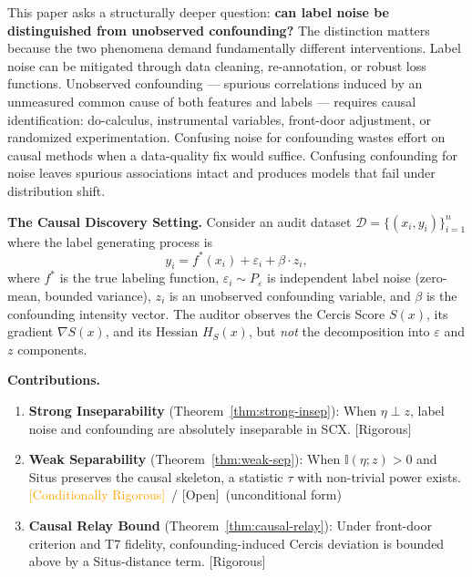 \documentclass[12pt,a4paper]{article}
\newcommand{\rigorous}{\textcolor{green!50!black}{\small\textsf{[Rigorous]}}}
\newcommand{\conditionallyrigorous}{\textcolor{orange}{\small\textsf{[Conditionally Rigorous]}}}
\newcommand{\openquest}{\textcolor{red!70!black}{\small\textsf{[Open]}}}
\newcommand{\I}{\mathbb{I}}
\newcommand{\cD}{\mathcal{D}}
\begin{document}
This paper asks a structurally deeper question: \textbf{can label noise be
distinguished from unobserved confounding?}  The distinction matters because
the two phenomena demand fundamentally different interventions.  Label noise
can be mitigated through data cleaning, re-annotation, or robust loss
functions.  Unobserved confounding — spurious correlations induced by an
unmeasured common cause of both features and labels — requires causal
identification: do-calculus, instrumental variables, front-door adjustment, or
randomized experimentation.  Confusing noise for confounding wastes effort on
causal methods when a data-quality fix would suffice.  Confusing confounding for
noise leaves spurious associations intact and produces models that fail under
distribution shift.

\medskip\noindent
\textbf{The Causal Discovery Setting.}
Consider an audit dataset $\cD = \{(x_i, y_i)\}_{i=1}^n$ where the label
generating process is
\begin{equation}\label{eq:label-process}
    y_i = f^*(x_i) + \varepsilon_i + \beta \cdot z_i,
\end{equation}
where $f^*$ is the true labeling function, $\varepsilon_i \sim P_\varepsilon$ is
independent label noise (zero-mean, bounded variance), $z_i$ is an unobserved
confounding variable, and $\beta$ is the confounding intensity vector.  The
auditor observes the Cercis Score $S(x)$, its gradient $\nabla S(x)$, and its
Hessian $H_S(x)$, but \emph{not} the decomposition into $\varepsilon$ and $z$
components.

\medskip\noindent
\textbf{Contributions.}
\begin{enumerate}[label=(\arabic*)]
    \item \textbf{Strong Inseparability} (Theorem~\ref{thm:strong-insep}):
          When $\eta \perp z$, label noise and confounding are absolutely
          inseparable in SCX.  \rigorous
    \item \textbf{Weak Separability} (Theorem~\ref{thm:weak-sep}):
          When $\I(\eta; z) > 0$ and Situs preserves the causal skeleton,
          a statistic $\tau$ with non-trivial power exists.  \conditionallyrigorous~/
          \openquest~(unconditional form)
    \item \textbf{Causal Relay Bound} (Theorem~\ref{thm:causal-relay}):
          Under front-door criterion and T7 fidelity, confounding-induced
          Cercis deviation is bounded above by a Situs-distance term.
          \rigorous
\end{enumerate}
\end{document}
